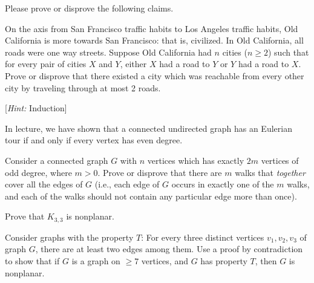 \documentclass[11pt]{article}
\begin{document}

Please prove or disprove the following claims.

\begin{Parts}

\Part  On the axis from San Francisco traffic habits to Los Angeles traffic habits, Old California is more towards San Francisco: that is, civilized. In Old California, all roads were one way streets. Suppose Old California had 
$n$ cities ($n \geq 2$) such that for every pair of cities $X$ and $Y$,
either $X$ had a road to $Y$ or $Y$ had a road to $X$. Prove or disprove that
there existed a city which was reachable from every other city by traveling through at
most 2 roads. 

[\textit{Hint:} Induction]

\Part  
In lecture, we have shown that a connected undirected graph has an Eulerian tour if and only if every vertex has even degree.

Consider a connected graph $G$ with $n$ vertices which has exactly $2m$ vertices of
odd degree, where $m > 0$. Prove or disprove that there are $m$ walks that \emph{together} 
cover all the edges of $G$ (i.e., each edge of $G$ occurs in exactly one of the $m$ walks, 
and each of the walks should not contain any particular edge more than once).

\end{Parts}


\begin{Parts}
\Part Prove that $K_{3,3}$ is nonplanar.

\Part Consider graphs with the property $T$:
For every three distinct vertices $v_1, v_2, v_3$ of graph $G$, there are at
least two edges among them.
Use a proof by contradiction to show that if $G$ is a graph on $\ge 7$ vertices, and $G$ has property $T$, then
$G$ is nonplanar.

\end{Parts}
\end{document}
